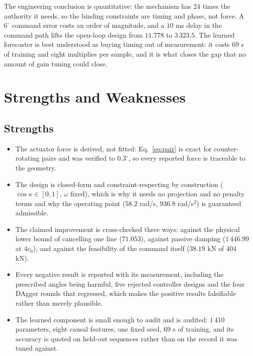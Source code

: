 \documentclass[12pt]{apmcmthesis}
\begin{document}
The engineering conclusion is quantitative: the mechanism has $24$ times the authority it needs,
so the binding constraints are timing and phase, not force. A $6^\circ$ command error costs an
order of magnitude, and a $10$ ms delay in the command path lifts the open-loop design from
$11.778$ to $3\,323.5$. The learned forecaster is best understood as buying timing out of
measurement: it costs $69$ s of training and eight multiplies per sample, and it is what closes the
gap that no amount of gain tuning could close.

\section{Strengths and Weaknesses}
\subsection{Strengths}
\begin{itemize}
  \item The actuator force is derived, not fitted: Eq.~\eqref{eq:pair} is exact for
  counter-rotating pairs and was verified to $0.3^\circ$, so every reported force is traceable to
  the geometry.
  \item The design is closed-form and constraint-respecting by construction
  ($\cos\kappa\in[0,1]$, $\omega$ fixed), which is why it needs no projection and no penalty terms
  and why the operating point ($58.2$ rad/s, $936.8$ rad/s$^2$) is guaranteed admissible.
  \item The claimed improvement is cross-checked three ways: against the physical lower bound of
  cancelling one line ($71.053$), against passive damping ($1\,446.99$ at $4c_0$), and against the
  feasibility of the command itself ($38.19$ kN of $404$ kN).
  \item Every negative result is reported with its measurement, including the prescribed angles
  being harmful, five rejected controller designs and the four DAgger rounds that regressed, which
  makes the positive results falsifiable rather than merely plausible.
  \item The learned component is small enough to audit and is audited: $1\,410$ parameters, eight
  causal features, one fixed seed, $69$ s of training, and its accuracy is quoted on held-out
  sequences rather than on the record it was tuned against.
\end{itemize}
\end{document}

